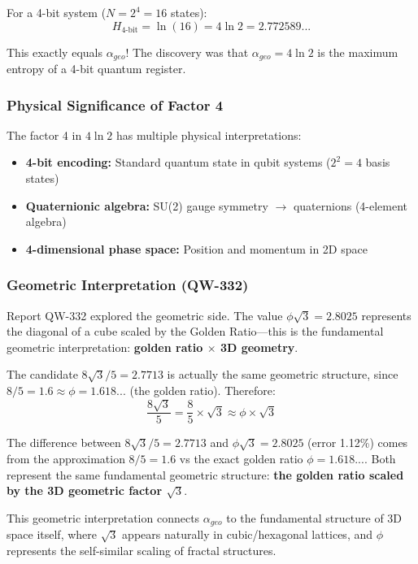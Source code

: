 \documentclass[11pt, a4paper]{article}
\begin{document}
For a 4-bit system ($N = 2^4 = 16$ states):
\begin{equation}
H_{4\text{-bit}} = \ln(16) = 4\ln 2 = 2.772589...
\end{equation}

This exactly equals $\alpha_{geo}$! The discovery was that $\alpha_{geo} = 4\ln 2$ is the maximum entropy of a 4-bit quantum register.

\subsubsection{Physical Significance of Factor 4}

The factor 4 in $4\ln 2$ has multiple physical interpretations:
\begin{itemize}
    \item \textbf{4-bit encoding:} Standard quantum state in qubit systems ($2^2 = 4$ basis states)
    \item \textbf{Quaternionic algebra:} SU(2) gauge symmetry $\to$ quaternions (4-element algebra)
    \item \textbf{4-dimensional phase space:} Position and momentum in 2D space
\end{itemize}

\subsubsection{Geometric Interpretation (QW-332)}

Report QW-332 explored the geometric side. The value $\phi\sqrt{3} = 2.8025$ represents the diagonal of a cube scaled by the Golden Ratio—this is the fundamental geometric interpretation: \textbf{golden ratio $\times$ 3D geometry}.

The candidate $8\sqrt{3}/5 = 2.7713$ is actually the same geometric structure, since $8/5 = 1.6 \approx \phi = 1.618...$ (the golden ratio). Therefore:
\begin{equation}
\frac{8\sqrt{3}}{5} = \frac{8}{5} \times \sqrt{3} \approx \phi \times \sqrt{3}
\end{equation}

The difference between $8\sqrt{3}/5 = 2.7713$ and $\phi\sqrt{3} = 2.8025$ (error 1.12\%) comes from the approximation $8/5 = 1.6$ vs the exact golden ratio $\phi = 1.618...$. Both represent the same fundamental geometric structure: \textbf{the golden ratio scaled by the 3D geometric factor $\sqrt{3}$}.

This geometric interpretation connects $\alpha_{geo}$ to the fundamental structure of 3D space itself, where $\sqrt{3}$ appears naturally in cubic/hexagonal lattices, and $\phi$ represents the self-similar scaling of fractal structures.
\end{document}
